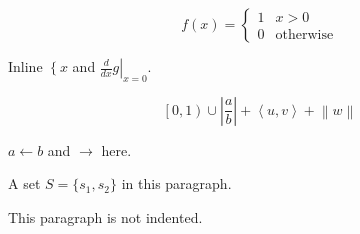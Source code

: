 \documentclass{article}
\begin{document}
\begin{equation*}
  f(x) = \left\{
    \begin{array}{ll}
      1 & x > 0 \\
      0 & \text{otherwise}
    \end{array}
  \right.
\end{equation*}

Inline $\left\{ x \right.$ and $\left. \frac{d}{dx} g \right|_{x=0}$.

\begin{equation*}
  \left[
    0, 1
  \right)
  \cup
  \left|
    \frac{a}{b}
  \right|
  + \left\langle u,
  v \right\rangle
  + \left\| w
  \right\|
\end{equation*}

$a \leftarrow b$ and $\rightarrow$ here.

A set $S = \{s_1,
s_2\}$ in this paragraph.

This paragraph is not indented.
\end{document}
